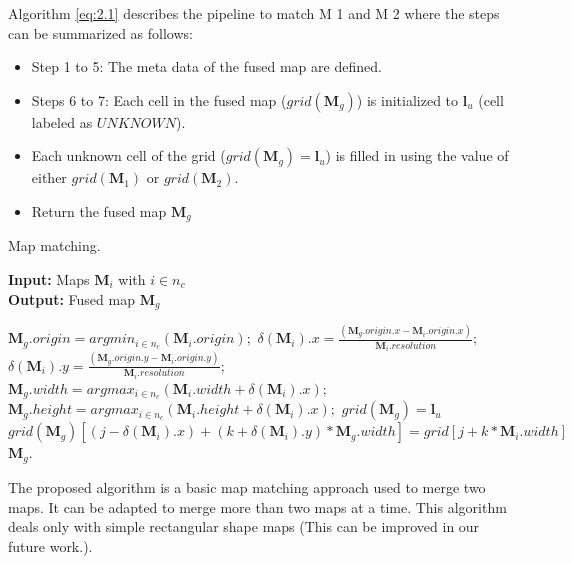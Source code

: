 \documentclass[11pt,openany]{book}
\begin{document}
Algorithm \ref{eq:2.1} describes the pipeline to match M 1 and M 2 where the steps can be summarized as follows:
\begin{itemize}
    \item Step 1 to 5: The meta data of the fused map are deﬁned.
    \item Steps 6 to 7: Each cell in the fused map ($grid(\mathbf{M}_g)$) is initialized to $\mathbf{l}_u$ (cell labeled as $U N K N O W N $).
    \item Each unknown cell of the grid ($grid(\mathbf{M}_g)=\mathbf{l}_u$) is filled in using the value of either $grid(\mathbf{M}_1)$ or $grid(\mathbf{M}_2)$.
    \item Return the fused map $\mathbf{M}_g$
\end{itemize}
\begin{algorithm}
    \caption{Map matching.}
    \hspace*{\algorithmicindent} \textbf{Input:} Maps $\mathbf{M}_i$ with $i \in n_c$ \\
    \hspace*{\algorithmicindent} \textbf{Output:} Fused map $\mathbf{M}_g$
    \begin{algorithmic}[1]
        \STATE $\mathbf{M}_g.origin=argmin_{i \in n_c}(\mathbf{M}_i.origin);$
        \STATE $\delta(\mathbf{M}_i).x=\frac{(\mathbf{M}_g.origin.x-\mathbf{M}_i.origin.x)}{\mathbf{M}_i.resolution};$
        \STATE $\delta(\mathbf{M}_i).y=\frac{(\mathbf{M}_g.origin.y-\mathbf{M}_i.origin.y)}{\mathbf{M}_i.resolution};$
        \STATE $\mathbf{M}_g.width=argmax_{i \in n_c}(\mathbf{M}_i.width + \delta(\mathbf{M}_i).x);$
        \STATE $\mathbf{M}_g.height=argmax_{i \in n_c}(\mathbf{M}_i.height + \delta(\mathbf{M}_i).x);$
        \STATE $grid(\mathbf{M}_g)=\mathbf{l}_u$
        \STATE $grid(\mathbf{M}_g)\left[ (j-\delta(\mathbf{M}_i).x)+(k+\delta(\mathbf{M}_i).y)*\mathbf{M}_g.width \right]=grid\left[ j+k*\mathbf{M}_i.width \right]$
        \ENDIF
        \ENDFOR
        \ENDFOR
        \ENDFOR
        \ENDFOR
        \RETURN $\mathbf{M}_g.$
    \end{algorithmic}
\end{algorithm}
The proposed algorithm is a basic map matching approach used to merge two maps. It can be adapted to merge more than two maps at a time. This algorithm deals only with simple rectangular shape maps (This can be improved in our future work.).
\end{document}
